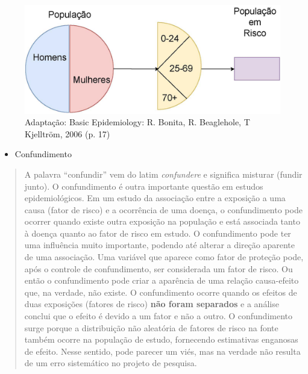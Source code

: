 \documentclass[
]{book}
\providecommand{\tightlist}{%
  \setlength{\itemsep}{0pt}\setlength{\parskip}{0pt}}
\begin{document}
\hfill\break

\begin{figure}

{\centering \includegraphics[width=0.6\linewidth]{images8/ilustracao_epidemiologia1} 

}

\caption{Adaptação: Basic Epidemiology: R. Bonita, R. Beaglehole, T Kjelltröm, 2006 (p. 17)}\label{fig:fig1}
\end{figure}

\hfill\break

\begin{itemize}
\tightlist
\item
  Confundimento
\end{itemize}

\hfill\break

\begin{quote}
A palavra ``confundir'' vem do latim \emph{confundere} e significa misturar (fundir junto). O confundimento é outra importante questão em estudos epidemiológicos. Em um estudo da associação entre a exposição a uma causa (fator de risco) e a ocorrência de uma doença, o confundimento pode ocorrer quando existe outra exposição na população e está associada tanto à doença quanto ao fator de risco em estudo. O confundimento pode ter uma influência muito importante, podendo até alterar a direção aparente de uma associação. Uma variável que aparece como fator de proteção pode, após o controle de confundimento, ser considerada um fator de risco. Ou então o confundimento pode criar a aparência de uma relação causa-efeito que, na verdade, não existe. O confundimento ocorre quando os efeitos de duas exposições (fatores de risco) \textbf{não foram separados} e a análise conclui que o efeito é devido a um fator e não a outro. O confundimento surge porque a distribuição não aleatória de fatores de risco na fonte também ocorre na população de estudo, fornecendo estimativas enganosas de efeito. Nesse sentido, pode parecer um viés, mas na verdade não resulta de um erro sistemático no projeto de pesquisa.
\end{quote}

\hfill\break
\end{document}
